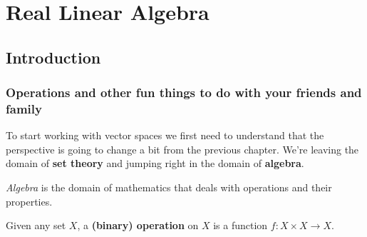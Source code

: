 \chapter{Real Linear Algebra}
\section{Introduction}
\subsection{Operations and other fun things to do with your friends and family}

To start working with vector spaces we first need to understand that the perspective is going to change a bit from the previous chapter. We're leaving the domain of \textbf{set theory} and jumping right in the domain of \textbf{algebra}.

\textit{Algebra }is the domain of mathematics that deals with operations and their properties.

\begin{df}
	Given any set $X$, a \textbf{(binary) operation} on $X$ is a function $f:X\times X \to X$.
\end{df}

